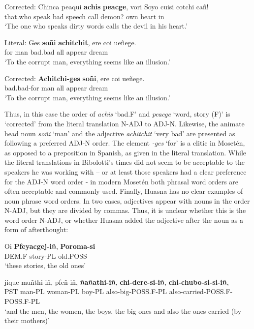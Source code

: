 \documentclass[output=paper,colorlinks,citecolor=brown
]{langscibook}
\begin{document}
Corrected:
\ea \label{sakel_example_16}
\gll Chinca  peaqui  \textbf{achis}  \textbf{peacge},  vori    Soyo   cuisi   cotchi  cañ!\\
     that.who   speak    bad    speech	call   demon?  own heart   in\\
\glt ‘The one who speaks dirty words calls the devil in his heart.’
\z	

Literal:
\ea \label{sakel_example_17}
\gll Ges \textbf{soñi} \textbf{achitchit}, ere coi ueñege.\\
     for    man bad.bad all appear  dream\\
\glt ‘To the corrupt man, everything seems like an illusion.’
\z	

Corrected:
\ea \label{sakel_example_18}
\gll \textbf{Achitchi-ges} \textbf{soñi}, ere coi ueñege.\\
     bad.bad-for    man all appear  dream\\
\glt ‘To the corrupt man, everything seems like an illusion.’
\z	

Thus, in this case the order of \textit{achis} ‘bad.F’ and \textit{peacge} ‘word, story (F)’ is ‘corrected’ from the literal translation N-ADJ to ADJ-N. Likewise, the animate head noun \textit{soñi} ‘man’ and the adjective \textit{achitchit} ‘very bad’ are presented as following a preferred ADJ-N order. The element \textit{-ges} ‘for’ is a clitic in Mosetén, as opposed to a preposition in Spanish, as given in the literal translation.
While the literal translations in Bibolotti’s times did not seem to be acceptable to the speakers he was working with – or at least those speakers had a clear preference for the ADJ-N word order - in modern Mosetén both phrasal word orders are often acceptable and commonly used.	
Finally, Huasna has no clear examples of noun phrase word orders. In two cases, adjectives appear with nouns in the order N-ADJ, but they are divided by commas. Thus, it is unclear whether this is the word order N-ADJ, or whether Huasna added the adjective after the noun as a form of afterthought:

\ea \label{sakel_example_19}
\gll Oi 		\textbf{Pfeyacgej-iñ}, 		\textbf{Poroma-si}\\
     DEM.F	story-PL		old.POSS\\
\glt ‘these stories, the old ones’
\z	

\ea \label{sakel_example_20}
\gll jique	muñthi-iñ,	pfeñ-iñ,	\textbf{ñañathi-iñ},  \textbf{chi-dere-si-iñ},		\textbf{chi-chubo-si-si-iñ},\\
     	PST	man-PL	woman-PL	boy-PL	also-big-POSS.F-PL	also-carried-POSS.F-POSS.F-PL\\
\glt ‘and the men, the women, the boys, the big ones and also the ones carried (by their mothers)’
\z	
	
\end{document}
